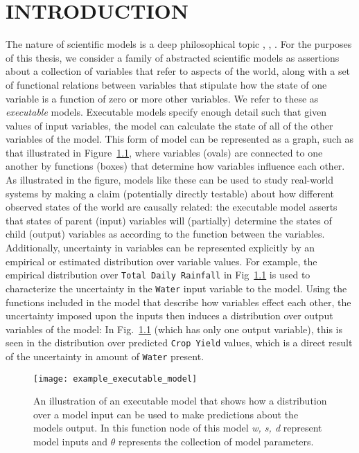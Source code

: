\chapter{INTRODUCTION\label{chapter:introduction}}
The nature of scientific models is a deep philosophical topic \citep{giere2010explaining}, \citep{morrison2009models}, \citep{frigg2006models}.
For the purposes of this thesis, we consider a family of abstracted scientific models as assertions about a collection of variables that refer to aspects of the world, along with a set of functional relations between variables that stipulate how the state of one variable is a function of zero or more other variables. We refer to these as {\em executable} models. Executable models specify enough detail such that given values of input variables, the model can calculate the state of all of the other variables of the model.
This form of model can be represented as a graph, such as that illustrated in Figure~\ref{fig:example_sci_model}, where variables (ovals) are connected to one another by functions (boxes) that determine how variables influence each other.
As illustrated in the figure, models like these can be used to study real-world systems by making a claim (potentially directly testable) about how different observed states of the world are causally related: the executable model asserts that states of parent (input) variables will (partially) determine the states of child (output) variables as according to the function between the variables.
Additionally, uncertainty in variables can be represented explicitly by an empirical or estimated distribution over variable values. For example, the empirical distribution over {\tt Total Daily Rainfall} in Fig~\ref{fig:example_sci_model} is used to characterize the uncertainty in the {\tt Water} input variable to the model.
Using the functions included in the model that describe how variables effect each other, the uncertainty imposed upon the inputs then induces a distribution over output variables of the model: In Fig.~\ref{fig:example_sci_model} (which has only one output variable), this is seen in the distribution over predicted {\tt Crop Yield} values, which is a direct result of the uncertainty in amount of {\tt Water} present.

\begin{figure}[!htbp]
  \centering
  \texttt{[image: example\_executable\_model]}
  \caption[Example of a Scientific Model]{An illustration of an executable model that shows how a distribution over a model input can be used to make predictions about the models output. In this function node of this model \textit{w, s, d} represent model inputs and $\theta$ represents the collection of model parameters.}
  \label{fig:example_sci_model}
\end{figure}

